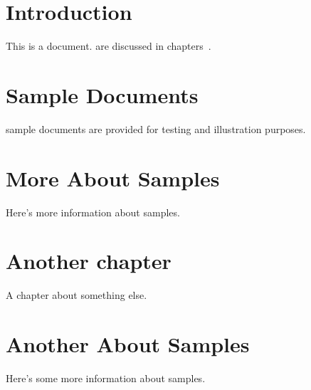 \documentclass{report}
\begin{document}
\chapter{Introduction}

This is a  document. 
are discussed in chapters~.

\chapter{Sample Documents}

\Gls{sample} documents are provided for testing and illustration
purposes.

\chapter{More About Samples}

Here's more information about \glspl{sample}.

\chapter{Another chapter}

A chapter about something else.

\chapter{Another About Samples}

Here's some more information about \glspl{sample}.

\printglossaries
\end{document}
